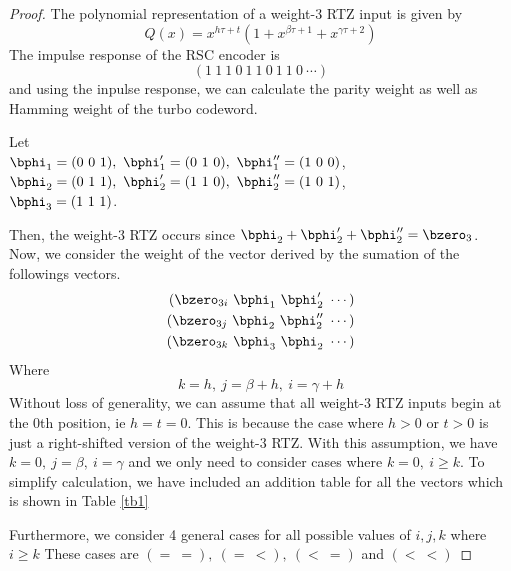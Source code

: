 \documentclass[11pt, oneside, dvipdfmx]{book}
\begin{document}
\begin{proof}
The polynomial representation of a weight-$3$ RTZ input is given by $$Q(x) =x^{h\tau+t}(1+x^{\beta \tau +1}+x^{\gamma \tau +2})$$
The impulse response of the RSC encoder is
\[
(1~1~1~0~1~1~0~1~1~0~\cdots)
\]
and using the inpulse response, we can calculate the parity weight as well as Hamming weight of the turbo codeword. 

Let \\$\bphi_1=(0~0~1),~\bphi'_1=(0~1~0),~\bphi''_1=(1~0~0)$, \\
$\bphi_2=(0~1~1),~\bphi'_2=(1~1~0),~\bphi''_2=(1~0~1)$, \\
$\bphi_3=(1~1~1)$. 

Then, the weight-3 RTZ occurs since $\bphi_2+\bphi'_2+\bphi''_2=\bzero_3$. 
Now, we consider the weight of the vector derived by the sumation of the followings vectors.
\begin{eqnarray*}
(\bzero_{3i}~\bphi_1~\bphi'_2~\cdots)\cr
(\bzero_{3j}~\bphi_2~\bphi''_2~\cdots)\cr
(\bzero_{3k}~\bphi_3~\bphi_2~\cdots)
\end{eqnarray*}
Where 
$$k=h,~j=\beta+h,~i=\gamma+h$$
Without loss of generality, we can assume that all weight-$3$ RTZ inputs begin at the $0$th position, ie $h=t=0$. This is because the case where $h>0$ or $t>0$ is just a right-shifted version of the weight-$3$ RTZ. With this assumption, we have $k=0,~j=\beta,~i=\gamma$ and we only need to consider cases where $k = 0,~i \geq k$.
To simplify calculation, we have included an addition table for all the vectors which is shown in Table \ref{tb1}

\begin{table}[h!]
\centering
{}
\caption{Truth Table}
\label{tb1}
\end{table}
Furthermore, we consider 4 general cases for all possible values of $i,j,k$ where $i \geq k$ These cases are $(=~=),~(=~<),~(<~=)$ and $(<~<)$

\end{proof}
\end{document}
